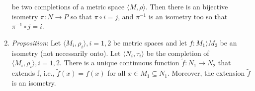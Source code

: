 \documentclass[10pt]{article}
\begin{document}
\begin{multicols*}{3}
\begin{enumerate}
		      be two completions of a metric space \(\langle M,\rho\rangle\). Then there is
		      an bijective isometry \(\pi:N\to P\) so that \(\pi\circ i = j\), and
		      \(\pi^{-1}\) is an isometry too so that \(\pi^{-1}\circ j = i\).
		\item \emph{Proposition}: Let \(\langle M_i,\rho_i\rangle, i=1,2\) be metric spaces and
		      let \(f:M_1 \rangle M_2\) be an isometry (not necessarily onto). Let
		      \(\langle N_i,\tau_i\rangle\) be the completion of \(\langle
		      M_i,\rho_i\rangle, i=1,2\). There is a unique continuous function
		      \(\widetilde{f}:N_1 \to N_2\) that extends f, i.e.,
		      \(\widetilde{f}(x)=f(x)\) for all \(x\in M_1\subseteq N_1\). Moreover, the
		      extension \(\widetilde{f}\) is an isometry.
	\end{enumerate}


\end{multicols*}
\end{document}

